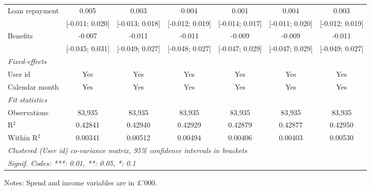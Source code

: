 \begin{table}[htbp]
\begin{threeparttable}[b]
\begin{tabular}{lcccccc}
         Loan repayment            & 0.005           & 0.003            & 0.004           & 0.001           & 0.004           & 0.003\\   
                                   & [-0.011; 0.020] & [-0.013; 0.018]  & [-0.012; 0.019] & [-0.014; 0.017] & [-0.011; 0.020] & [-0.012; 0.019]\\   
         Benefits                  & -0.007          & -0.011           & -0.011          & -0.009          & -0.009          & -0.011\\   
                                   & [-0.045; 0.031] & [-0.049; 0.027]  & [-0.048; 0.027] & [-0.047; 0.029] & [-0.047; 0.029] & [-0.049; 0.027]\\   
         \midrule
         \emph{Fixed-effects}\\
         User id                   & Yes             & Yes              & Yes             & Yes             & Yes             & Yes\\  
         Calendar month            & Yes             & Yes              & Yes             & Yes             & Yes             & Yes\\  
         \midrule
         \emph{Fit statistics}\\
         Observations              & 83,935          & 83,935           & 83,935          & 83,935          & 83,935          & 83,935\\  
         R$^2$                     & 0.42841         & 0.42940          & 0.42929         & 0.42879         & 0.42877         & 0.42950\\  
         Within R$^2$              & 0.00341         & 0.00512          & 0.00494         & 0.00406         & 0.00403         & 0.00530\\  
         \midrule \midrule
         \multicolumn{7}{l}{\emph{Clustered (User id) co-variance matrix, 95\% confidence intervals in brackets}}\\
         \multicolumn{7}{l}{\emph{Signif. Codes: ***: 0.01, **: 0.05, *: 0.1}}\\
      \end{tabular}
      
      \begin{tablenotes}\footnotesize
         \item Notes: Spend and income variables are in \pounds'000.
      \end{tablenotes}
   \end{threeparttable}
\end{table}


